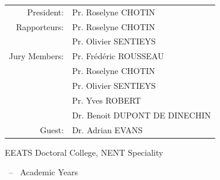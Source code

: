 \begin{titlepage}
\begin{minipage}[t][0.13\headerheight]{\linewidth}
    \normalsize
    \centering

    \begin{tabular}{rl}
        President: & Pr. Roselyne CHOTIN \\
        Rapporteurs: & Pr. Roselyne CHOTIN \\
        & Pr. Olivier SENTIEYS \\
        Jury Members: & Pr. Fr\'ed\'eric ROUSSEAU \\
        & Pr. Roselyne CHOTIN \\
        & Pr. Olivier SENTIEYS \\
        & Pr. Yves ROBERT \\
        & Dr. Benoit DUPONT DE DINECHIN \\
        Guest: & Dr. Adrian EVANS
    \end{tabular}

\end{minipage}

\begin{minipage}[b][0.07\headerheight]{\linewidth}
    \normalsize
    \centering

    EEATS Doctoral College, NENT Speciality
    
    \StartYear~-- \EndYear~Academic Years

\end{minipage}

\end{titlepage}

\restoregeometry